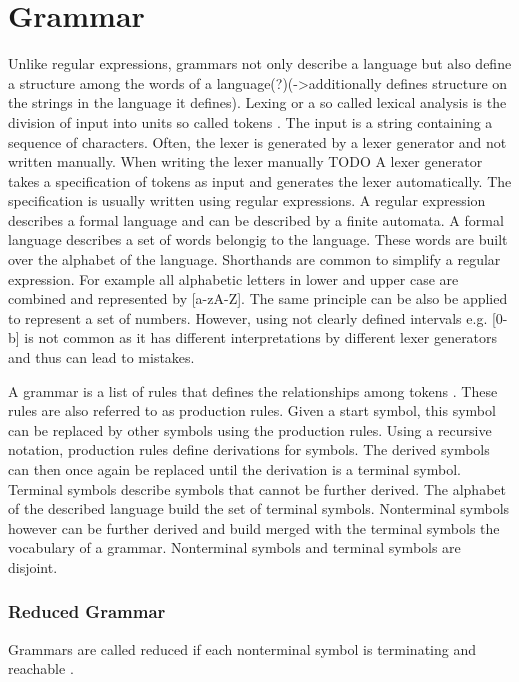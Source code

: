 \section{Grammar}\label{sec:BackgroundGrammar}
Unlike regular expressions, grammars not only describe a language but also define a structure among the words of a language(?)(->additionally defines structure on the strings in the language it defines).
Lexing or a so called lexical analysis is the division of input into units so called tokens \cite{LexYacc.1992}. 
The input is a string containing a sequence of characters. 
Often, the lexer is generated by a lexer generator and not written manually.
When writing the lexer manually TODO
A lexer generator takes a specification of tokens as input and generates the lexer automatically. 
The specification is usually written using regular expressions. 
A regular expression describes a formal language and can be described by a finite automata.
A formal language describes a set of words belongig to the language.
These words are built over the alphabet of the language.
Shorthands are common to simplify a regular expression.
For example all alphabetic letters in lower and upper case are combined and represented by [a-zA-Z].
The same principle can be also be applied to represent a set of numbers.
However, using not clearly defined intervals e.g. [0-b] is not common as it has different interpretations by different lexer generators and thus can lead to mistakes. \cite{Mogensen.2017}

A grammar is a list of rules that defines the relationships among tokens \cite{LexYacc.1992}.
These rules are also referred to as production rules.
Given a start symbol, this symbol can be replaced by other symbols using the production rules.
Using a recursive notation, production rules define derivations for symbols. The derived symbols can then once again be replaced until the derivation is a terminal symbol.  
Terminal symbols describe symbols that cannot be further derived. The alphabet of the described language build the set of terminal symbols.
Nonterminal symbols however can be further derived and build  merged with the terminal symbols the vocabulary of a grammar. Nonterminal symbols and terminal symbols are disjoint. 

\subsubsection{Reduced Grammar}
Grammars are called reduced if each nonterminal symbol is terminating and reachable \cite{Cremers75}.
 
